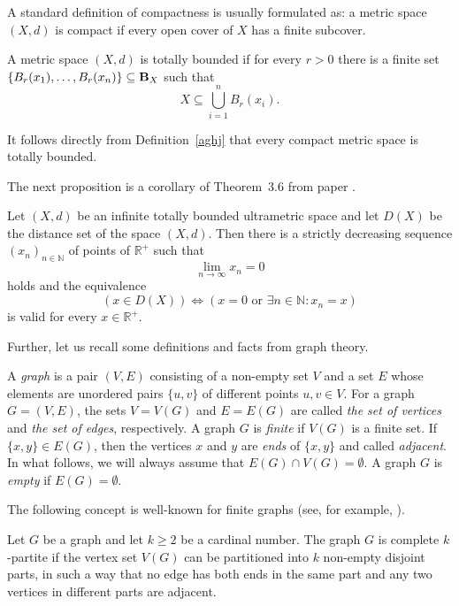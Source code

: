 \documentclass{article}
\begin{document}
A standard definition of compactness is usually formulated as:
a metric space $(X,d)$ is compact if every open cover of $X$ has a finite subcover.



\begin{Definition}\label{aghj}
A metric space $(X,d)$ is totally bounded if for every
$r>0$ there is a finite set
\(
\{B_r(x_1),\ldots,B_r(x_n)\}\subseteq {\bf B}_X
\)
such that
\[
X \subseteq \bigcup_{i=1}^{n} B_r(x_i).
\]
\end{Definition}




It follows directly from Definition~\ref{aghj} that every compact metric space is totally bounded.



The next proposition is a corollary of Theorem~3.6 from paper \cite{DS2022TRoUCaS}.

\begin{Proposition}\label{zbhfd}
Let $(X,d)$ be an infinite totally bounded ultrametric space and let $D(X)$ be the distance set of the space $(X,d)$. Then there is a 
 strictly decreasing sequence
$(x_n)_{n \in \mathbb{N}}$ of points of $\mathbb R^+$ such that
\[
\lim_{n \to \infty} x_n = 0
\]
 holds and the equivalence
\[
(x \in D(X)) \iff (x = 0 \text{ or } \exists n \in \mathbb{N} : x_n = x)
\]
is valid for every $x \in \mathbb{R}^+$.
\end{Proposition}







Further, let us recall some definitions and facts from graph theory.


A \textit{graph} is a pair $(V, E)$ consisting of a non-empty set $V$ and a set $E$ whose elements are unordered pairs $\{u, v\}$ of different points $u, v \in V$. For a graph $G = (V, E)$, the sets $V = V(G)$ and $E = E(G)$ are called \textit{the set of vertices} and \textit{the set of edges}, respectively. A graph $G$ is \textit{finite} if $V(G)$ is a finite set. If $\{x, y\} \in E(G)$, then the vertices $x$ and $y$ are \emph{ends} of $\{x,y\}$ and called \textit{adjacent}. In what follows, we will always assume that $E(G) \cap V(G) = \emptyset$.
A graph $G$ is \emph{empty} if $E(G)=\emptyset$.

The following concept is well-known for finite graphs  (see, for example, \cite[p.~17]{Diestel2005}). 

\begin{Definition}\label{scfr} Let $G$ be a graph and let $k \geq 2$ be a cardinal number. The graph $G$
is complete $k$-partite if the vertex set $V(G)$ can be partitioned into $k$ non-empty
disjoint parts, in such a way that no edge has both ends in the same part and
any two vertices in different parts are adjacent.
\end{Definition}
\end{document}

